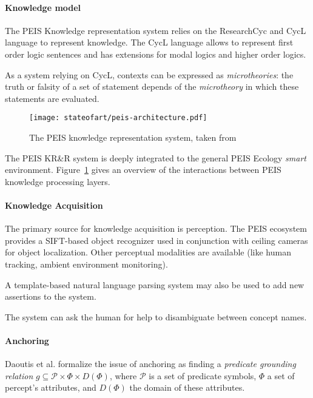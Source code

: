 \paragraph{Knowledge model} The PEIS Knowledge representation system relies on
the {\sc ResearchCyc} and {\sc CycL} language to represent knowledge. The {\sc CycL} language
allows to represent first order logic sentences and has extensions for modal logics and higher order logics.


As a system relying on {\sc CycL}, contexts can be expressed as
\emph{microtheories}: the truth or falsity of a set of statement depends of the
\emph{microtheory} in which these statements are evaluated.


\begin{figure}
	\centering
	\texttt{[image: stateofart/peis-architecture.pdf]}
	\caption{The PEIS knowledge representation system, taken from~\cite{Daoutis2009}}
	\label{fig|peis-archi}
\end{figure}

The PEIS KR\&R system is deeply integrated to the general PEIS Ecology
\emph{smart} environment. Figure~\ref{fig|peis-archi} gives an overview of the
interactions between PEIS knowledge processing layers.

\paragraph{Knowledge Acquisition} The primary source for knowledge acquisition
is perception.  The PEIS ecosystem provides a SIFT-based object recognizer used
in conjunction with ceiling cameras for object localization.  Other perceptual
modalities are available (like human tracking, ambient environment monitoring).

A template-based natural language parsing system may also be used to add new
assertions to the system.

The system can ask the human for help to disambiguate between concept names.

\paragraph{Anchoring} Daoutis et al. formalize the issue of anchoring as
finding a \emph{predicate grounding relation} $g \subseteq \mathcal{P} \times
\Phi \times D(\Phi)$, where $\mathcal{P}$ is a set of predicate symbols, $\Phi$
a set of percept's attributes, and $D(\Phi)$ the domain of these attributes.

